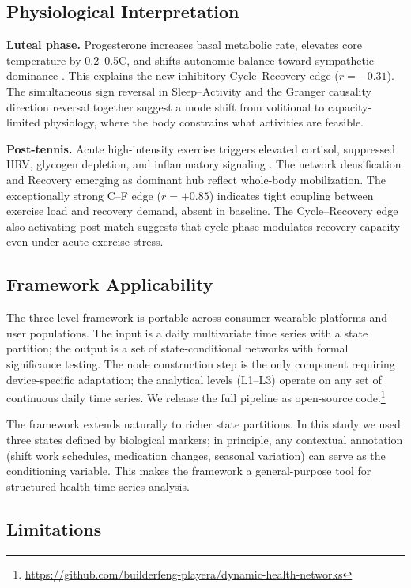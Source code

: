 \documentclass[letterpaper]{article}
\begin{document}
\subsection{Physiological Interpretation}

\textbf{Luteal phase.} Progesterone increases basal metabolic rate, elevates core temperature by 0.2--0.5\textdegree C, and shifts autonomic balance toward sympathetic dominance \citep{baker2007}. This explains the new inhibitory Cycle--Recovery edge ($r = -0.31$). The simultaneous sign reversal in Sleep--Activity and the Granger causality direction reversal together suggest a mode shift from volitional to capacity-limited physiology, where the body constrains what activities are feasible.

\textbf{Post-tennis.} Acute high-intensity exercise triggers elevated cortisol, suppressed HRV, glycogen depletion, and inflammatory signaling \citep{halson2014}. The network densification and Recovery emerging as dominant hub reflect whole-body mobilization. The exceptionally strong C--F edge ($r = +0.85$) indicates tight coupling between exercise load and recovery demand, absent in baseline. The Cycle--Recovery edge also activating post-match suggests that cycle phase modulates recovery capacity even under acute exercise stress.

\subsection{Framework Applicability}

The three-level framework is portable across consumer wearable platforms and user populations. The input is a daily multivariate time series with a state partition; the output is a set of state-conditional networks with formal significance testing. The node construction step is the only component requiring device-specific adaptation; the analytical levels (L1--L3) operate on any set of continuous daily time series. We release the full pipeline as open-source code.\footnote{\url{https://github.com/builderfeng-playera/dynamic-health-networks}}

The framework extends naturally to richer state partitions. In this study we used three states defined by biological markers; in principle, any contextual annotation (shift work schedules, medication changes, seasonal variation) can serve as the conditioning variable. This makes the framework a general-purpose tool for structured health time series analysis.

\subsection{Limitations}
\end{document}
